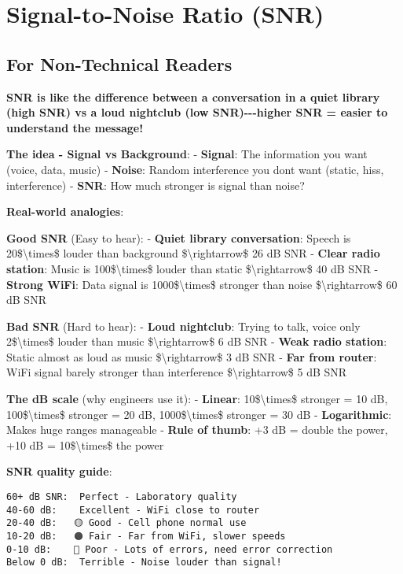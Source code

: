 \section{Signal-to-Noise Ratio (SNR)}\label{signal-to-noise-ratio-snr}

\subsection{\texorpdfstring{ For Non-Technical
Readers}{ For Non-Technical Readers}}\label{for-non-technical-readers}

\textbf{SNR is like the difference between a conversation in a quiet
library (high SNR) vs a loud nightclub (low SNR)-\/-\/-higher SNR =
easier to understand the message!}

\textbf{The idea - Signal vs Background}: - \textbf{Signal}: The
information you want (voice, data, music) - \textbf{Noise}: Random
interference you don\textquotesingle t want (static, hiss, interference)
- \textbf{SNR}: How much stronger is signal than noise?

\textbf{Real-world analogies}:

\textbf{Good SNR} (Easy to hear): - \textbf{Quiet library conversation}:
Speech is 20\$\textbackslash times\$ louder than background
\$\textbackslash rightarrow\$ 26 dB SNR - \textbf{Clear radio station}:
Music is 100\$\textbackslash times\$ louder than static
\$\textbackslash rightarrow\$ 40 dB SNR - \textbf{Strong WiFi}: Data
signal is 1000\$\textbackslash times\$ stronger than noise
\$\textbackslash rightarrow\$ 60 dB SNR

\textbf{Bad SNR} (Hard to hear): - \textbf{Loud nightclub}: Trying to
talk, voice only 2\$\textbackslash times\$ louder than music
\$\textbackslash rightarrow\$ 6 dB SNR - \textbf{Weak radio station}:
Static almost as loud as music \$\textbackslash rightarrow\$ 3 dB SNR -
\textbf{Far from router}: WiFi signal barely stronger than interference
\$\textbackslash rightarrow\$ 5 dB SNR

\textbf{The dB scale} (why engineers use it): - \textbf{Linear}:
10\$\textbackslash times\$ stronger = 10 dB, 100\$\textbackslash times\$
stronger = 20 dB, 1000\$\textbackslash times\$ stronger = 30 dB -
\textbf{Logarithmic}: Makes huge ranges manageable - \textbf{Rule of
thumb}: +3 dB = double the power, +10 dB = 10\$\textbackslash times\$
the power

\textbf{SNR quality guide}:

\begin{verbatim}
60+ dB SNR:  Perfect - Laboratory quality
40-60 dB:    Excellent - WiFi close to router
20-40 dB:   🟡 Good - Cell phone normal use
10-20 dB:   🟠 Fair - Far from WiFi, slower speeds
0-10 dB:    🔴 Poor - Lots of errors, need error correction
Below 0 dB:  Terrible - Noise louder than signal!
\end{verbatim}

